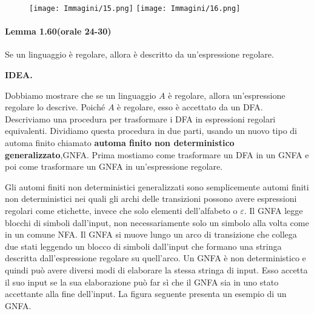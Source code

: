 \documentclass{article}
\begin{document}
\begin{figure}[H]
    \centering
    \texttt{[image: Immagini/15.png]}
    \texttt{[image: Immagini/16.png]}
    \label{fig:your_image}
\end{figure}

\paragraph{Lemma 1.60(orale 24-30)}
\label{lemma-1.60}
\text{  }
\begin{tcolorbox}[title=Lemma 1.60 (orale 24-30)]
    Se un linguaggio è regolare, allora è descritto da un'espressione regolare.
\end{tcolorbox}

\textbf{IDEA.}

Dobbiamo mostrare che se un linguaggio $A$ è regolare, allora un'espressione regolare lo descrive. 
Poiché $A$ è regolare, esso è accettato da un DFA. 
Descriviamo una procedura per trasformare i DFA in espressioni regolari equivalenti. 
Dividiamo questa procedura in due parti, usando un nuovo tipo di automa finito chiamato \textbf{automa finito non deterministico generalizzato},GNFA.
Prima mostiamo come trasformare un DFA in un GNFA e poi come trasformare un GNFA in un'espressione regolare.

Gli automi finiti non deterministici generalizzati sono semplicemente automi finiti non deterministici nei quali gli archi delle transizioni possono
avere espressioni regolari come etichette, invece che solo elementi dell'alfabeto o $\varepsilon$. 
Il GNFA legge blocchi di simboli dall'input, non necessariamente solo un simbolo alla volta come in un comune NFA. 
Il GNFA si muove lungo un arco di transizione che collega due stati leggendo un blocco di simboli dall'input che formano una stringa descritta dall'espressione regolare su quell'arco. 
Un GNFA è non deterministico e quindi può avere diversi modi di elaborare la stessa stringa di input.
Esso accetta il suo input se la sua elaborazione può far sì che il GNFA sia in uno stato accettante alla fine dell'input. 
La figura seguente presenta un esempio di un GNFA.
\end{document}
